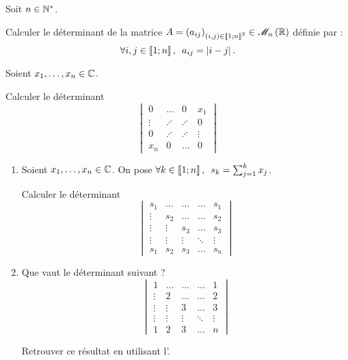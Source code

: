 \begin{exo}[Exercice 6]
Soit \(n\in\mathbb{N}^*\).

Calculer le déterminant de la matrice \(A=\paren{a_{ij}}_{\paren{i,j}\in\interventierii{1}{n}^2}\in\M{n}[\R]\) définie par : \[\quantifs{\forall i,j\in\interventierii{1}{n}}a_{ij}=\abs{i-j}.\]
\end{exo}

\begin{corr}
\end{corr}

\begin{exo}[Exercice 7]
Soient \(x_1,\dots,x_n\in\mathbb{C}\).

Calculer le déterminant \[\begin{vmatrix}
0 & \dots & 0 & x_1 \\
\vdots & \iddots & \iddots & 0 \\
0 & \iddots & \iddots & \vdots \\
x_n & 0 & \dots & 0
\end{vmatrix}\]
\end{exo}

\begin{corr}
\end{corr}

\begin{exo}[Exercice 8]
\begin{enumerate}
\item Soient \(x_1,\dots,x_n\in\mathbb{C}\). On pose \(\quantifs{\forall k\in\interventierii{1}{n}}s_k=\sum_{j=1}^kx_j\).

Calculer le déterminant \[\begin{vmatrix}
s_1 & \dots & \dots & \dots & s_1 \\
\vdots & s_2 & \dots & \dots & s_2 \\
\vdots & \vdots & s_3 & \dots & s_3 \\
\vdots & \vdots & \vdots & \ddots & \vdots \\
s_1 & s_2 & s_3 & \dots & s_n
\end{vmatrix}\]

\item Que vaut le déterminant suivant ? \[\begin{vmatrix}
1 & \dots & \dots & \dots & 1 \\
\vdots & 2 & \dots & \dots & 2 \\
\vdots & \vdots & 3 & \dots & 3 \\
\vdots & \vdots & \vdots & \ddots & \vdots \\
1 & 2 & 3 & \dots & n
\end{vmatrix}\]

Retrouver ce résultat en utilisant l'.
\end{enumerate}
\end{exo}

